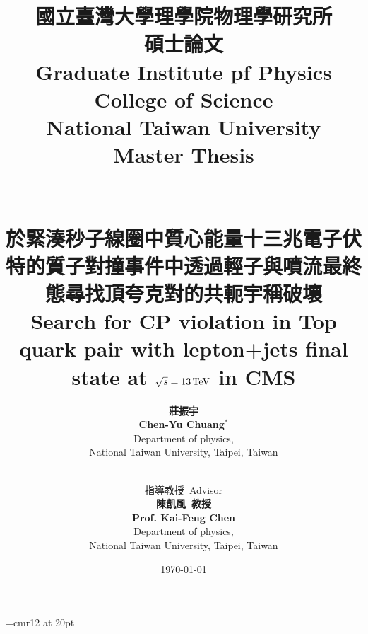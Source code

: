  
\font\myfonttwo=cmr12 at 20pt
\title{
{國立臺灣大學理學院物理學研究所\\
碩士論文}\\
{\myfonttwo Graduate Institute pf Physics\\
College of Science\\
National Taiwan University\\
Master Thesis}\\
~\\
\aline{}\\
{\myfonttwo 於緊湊秒子線圈中質心能量十三兆電子伏特的質子對撞事件中透過輕子與噴流最終態尋找頂夸克對的共軛宇稱破壞\\
Search for CP violation in Top quark pair with lepton+jets final state at $\sqrt{s} = 13\,\text{Te\hspace{-.08em}V}$ in CMS}\\
\aline{}}

\author{
\textbf{莊振宇}\\
\textbf{Chen-Yu Chuang$^*$}\\
Department of physics,\\
National Taiwan University, Taipei, Taiwan\\
~\\
\and
指導教授\ Advisor\\
\textbf{陳凱風\ 教授}\\
\textbf{Prof. Kai-Feng Chen}\\
Department of physics,\\
National Taiwan University, Taipei, Taiwan
}
\date{\today}
\maketitle
\thispagestyle{empty} %
\FloatBarrier
